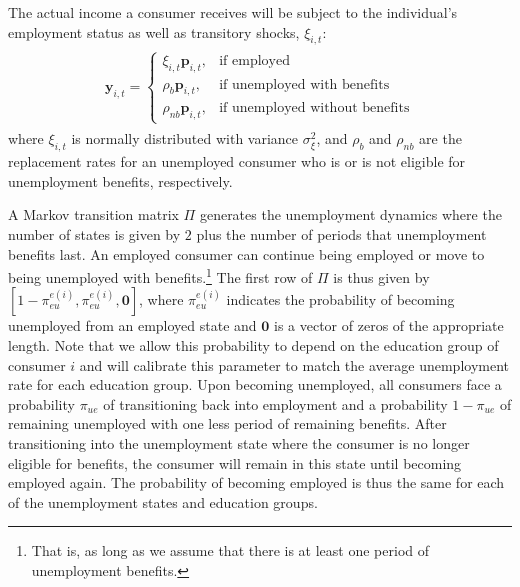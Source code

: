 \documentclass[\PathToRoot/\ProjectName]{subfiles}
\begin{document}
The actual income a consumer receives will be subject to the individual's employment status as well as transitory shocks, $\xi_{i,t}$:
\begin{equation}
  \begin{gathered}
    \begin{aligned}
      \mathbf{y}_{i,t} =   \begin{cases}
                             \xi_{i,t}\mathbf{p}_{i,t},  & \text{if employed}                    \\
                             \rho_b \mathbf{p}_{i,t},    & \text{if unemployed with benefits}    \\
                             \rho_{nb} \mathbf{p}_{i,t}, & \text{if unemployed without benefits}
                           \end{cases}
    \end{aligned}
  \end{gathered}
\end{equation}
where $\xi_{i,t}$ is normally distributed with variance $\sigma_{\xi}^2$, and $\rho_b$ and $\rho_{nb}$ are the replacement rates for an unemployed consumer who is or is not eligible for unemployment benefits, respectively.

A Markov transition matrix $\Pi$ generates the unemployment dynamics where the number of states is given by $2$ plus the number of periods that unemployment benefits last.
An employed consumer can continue being employed or move to being unemployed with benefits.\footnote{That is, as long as we assume that there is at least one period of unemployment benefits.} The first row of $\Pi$ is thus given by $[1-\pi_{eu}^{e(i)}, \pi_{eu}^{e(i)}, \mathbf{0}]$, where $\pi_{eu}^{e(i)}$ indicates the probability of becoming unemployed from an employed state and $\mathbf{0}$ is a vector of zeros of the appropriate length.
Note that we allow this probability to depend on the education group of consumer $i$ and will calibrate this parameter to match the average unemployment rate for each education group.
Upon becoming unemployed, all consumers face a probability $\pi_{ue}$ of transitioning back into employment and a probability $1-\pi_{ue}$ of remaining unemployed with one less period of remaining benefits.
After transitioning into the unemployment state where the consumer is no longer eligible for benefits, the consumer will remain in this state until becoming employed again.
The probability of becoming employed is thus the same for each of the unemployment states and education groups.
\end{document}
